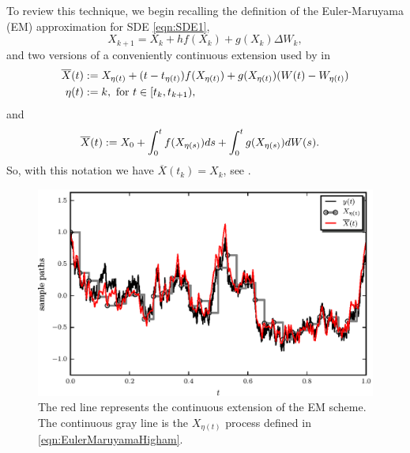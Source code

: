 \documentclass[sort&compress, preprint]{elsarticle}
\theoremstyle{definition}
\theoremstyle{plain}%
\theoremstyle{remark}
\begin{document}
	To review this technique, we begin  recalling the definition of the Euler-Maruyama (EM) approximation for SDE 
\eqref{eqn:SDE1}, %
\begin{equation}\label{eqn:EulerMaruyamaHigham}
	X_{k+1}= X_k+
		hf(X_k) + g(X_k)\Delta W_k,
\end{equation}
and two versions of a conveniently continuous extension used by
\citeauthor{Higham2002b} in \cite{Higham2002b} 
\begin{align}\label{eqn:EMContinuousExtension}
	\overline{X}(t)&:=
		X_{\eta(t)} + (t-t_{\eta(t)}) f(X_{\eta(t)}) + g(X_{\eta(t)})(W(t)-W_{\eta(t)})\\
		\eta(t)&:=
			 k, \text{ for } t\in[t_k,t_{k+1}), \notag
\end{align}
and
\begin{align}
		\overline{X}(t)
		&:=
			X_0 + \int_{0}^t f(X_{\eta(s)})ds + 
			\int_0^tg(X_{\eta(s)})dW(s). \notag \label{eqn:EMIntegralContinuousExtension}
	\end{align}
So, with this notation we have $\overline{X}(t_k)=X_k$, see .
%
\begin{figure}[h!]
	\centering
	\includegraphics{papers/paperB/sections/ContinuousExtPy/ContinuousExtension.eps}
	\caption{
		The red line represents the continuous extension of the EM scheme. The continuous gray line is the $X_{\eta(t)}$ 
		process defined in \eqref{eqn:EulerMaruyamaHigham}.
	}
	\label{fig:ContinuousExtension}
\end{figure}
\end{document}
